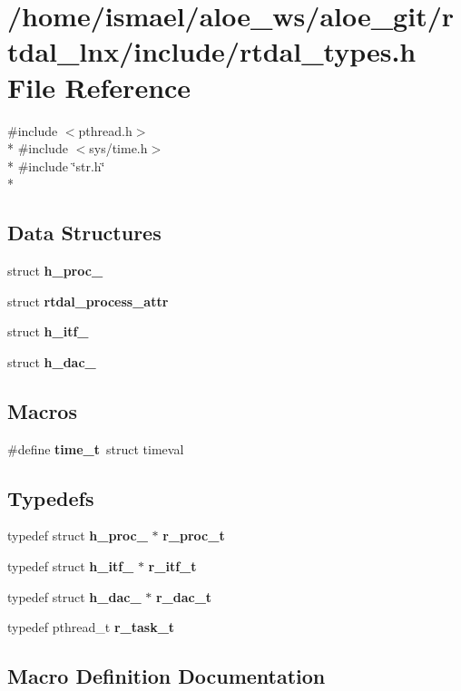 \section{/home/ismael/aloe\-\_\-ws/aloe\-\_\-git/rtdal\-\_\-lnx/include/rtdal\-\_\-types.h File Reference}
\label{rtdal__types_8h}
{\ttfamily \#include $<$pthread.\-h$>$}\\*
{\ttfamily \#include $<$sys/time.\-h$>$}\\*
{\ttfamily \#include \char`\"{}str.\-h\char`\"{}}\\*
\subsection*{Data Structures}
\begin{DoxyCompactItemize}
\item 
struct {\bf h\-\_\-proc\-\_\-}
\item 
struct {\bf rtdal\-\_\-process\-\_\-attr}
\item 
struct {\bf h\-\_\-itf\-\_\-}
\item 
struct {\bf h\-\_\-dac\-\_\-}
\end{DoxyCompactItemize}
\subsection*{Macros}
\begin{DoxyCompactItemize}
\item 
\#define {\bf time\-\_\-t}~struct timeval
\end{DoxyCompactItemize}
\subsection*{Typedefs}
\begin{DoxyCompactItemize}
\item 
typedef struct {\bf h\-\_\-proc\-\_\-} $\ast$ {\bf r\-\_\-proc\-\_\-t}
\item 
typedef struct {\bf h\-\_\-itf\-\_\-} $\ast$ {\bf r\-\_\-itf\-\_\-t}
\item 
typedef struct {\bf h\-\_\-dac\-\_\-} $\ast$ {\bf r\-\_\-dac\-\_\-t}
\item 
typedef pthread\-\_\-t {\bf r\-\_\-task\-\_\-t}
\end{DoxyCompactItemize}


\subsection{Macro Definition Documentation}
